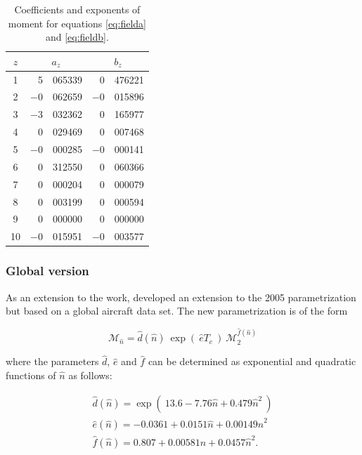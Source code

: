 \documentclass{UMDP_article}
\begin{document}
\begin{table}[ht!]
\begin{center}
\begin{tabular}{cr@{.}lr@{.}l}
\hline
$z$ & \multicolumn{2}{c}{$a_z$} & \multicolumn{2}{c}{$b_z$} \\
\hline
1 &  5&065339    & 0&476221        \\
2 &  $-$0&062659   & $-$0&015896    \\
3 &  $-$3&032362   & 0&165977        \\
4 &  0&029469      & 0&007468         \\
5 &  $-$0&000285   & $-$0&000141       \\
6 &  0&312550      & 0&060366           \\
7 &  0&000204      & 0&000079            \\
8 &  0&003199      & 0&000594             \\
9 &  0&000000      & 0&000000              \\
10 & $-$0&015951   & $-$0&003577            \\ 
\hline
\end{tabular}
\end{center}
\caption{Coefficients and exponents of moment for equations \ref{eq:fielda} and
\ref{eq:fieldb}.\label{tab:field}}
\end{table}

\subsubsection{Global version}
\label{sec:field_psd_gl}
As an extension to the \cite{Field:etal:2005} work, \cite{Field:etal:2007} 
developed an extension to the 2005 parametrization but based 
on a global aircraft data set. The new parametrization is of the form

\begin{equation}
\label{eq:field2}
\mathcal{M}_{\hat{n}} = \hat{d}(\hat{n})~\exp(~\hat{e}T_c~)~
\mathcal{M}_2^{\hat{f}(\hat{n})} 
\end{equation}

where the parameters $\hat{d}$, $\hat{e}$ and $\hat{f}$ can be determined as 
exponential and quadratic functions of $\hat{n}$ as follows:

\begin{eqnarray}
\label{eq:field2d}
\hat{d}(\hat{n})=\exp(~13.6-7.76\hat{n}+0.479\hat{n}^2~) \nonumber \\
\hat{e}(\hat{n})=-0.0361 + 0.0151\hat{n}+0.00149\hat{n}^2 \nonumber \\
\hat{f}(\hat{n})=0.807 + 0.00581\hat{n} + 0.0457\hat{n}^2 .
\end{eqnarray}
\end{document}
